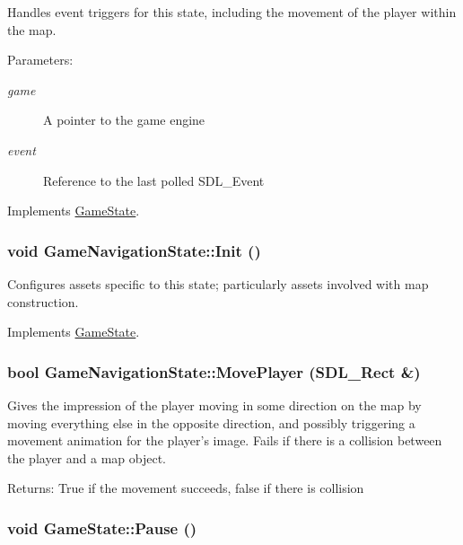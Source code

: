 Handles event triggers for this state, including the movement of the player within the map.

\begin{Desc}
\item[Parameters:]
\begin{description}
\item[{\em game}]A pointer to the game engine \item[{\em event}]Reference to the last polled SDL\_\-Event \end{description}
\end{Desc}


Implements \hyperlink{class_game_state_de7bd9bda91253614322ca0ea77b7a14}{GameState}.\hypertarget{class_game_navigation_state_8f613860bf544476ab9cff9fb7f98201}{
\subsubsection[{Init}]{\setlength{\rightskip}{0pt plus 5cm}void GameNavigationState::Init ()}}
\label{de/d2a/class_game_navigation_state_8f613860bf544476ab9cff9fb7f98201}


Configures assets specific to this state; particularly assets involved with map construction. 

Implements \hyperlink{class_game_state_eec488593bae214c0f738bd64dafba32}{GameState}.\hypertarget{class_game_navigation_state_23f15bb01ff8d7d304949c5b336d59f2}{
\subsubsection[{MovePlayer}]{\setlength{\rightskip}{0pt plus 5cm}bool GameNavigationState::MovePlayer (SDL\_\-Rect \&)}}
\label{de/d2a/class_game_navigation_state_23f15bb01ff8d7d304949c5b336d59f2}


Gives the impression of the player moving in some direction on the map by moving everything else in the opposite direction, and possibly triggering a movement animation for the player's image. Fails if there is a collision between the player and a map object.

\begin{Desc}
\item[Returns:]True if the movement succeeds, false if there is collision \end{Desc}
\hypertarget{class_game_state_0c47c6969a4e0bb32d6cdf7bf9376817}{
\subsubsection[{Pause}]{\setlength{\rightskip}{0pt plus 5cm}void GameState::Pause ()}}
\label{dd/d87/class_game_state_0c47c6969a4e0bb32d6cdf7bf9376817}


